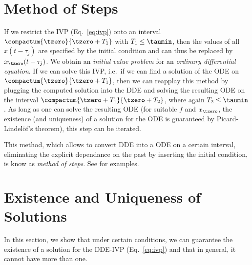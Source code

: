 \section{Method of Steps}
    \label{sec:method-of-steps}
    
    If we restrict the IVP (Eq.~\ref{eq:ivp}) onto an interval $\compactum{\tzero}{\tzero+T_1}$ with $T_1\leq\taumin$, then the values of all $x(t-\tau_j)$ are specified by the initial condition and can thus be replaced by $x_{\tzero}(t-\tau_j)$.
    We obtain an \emph{initial value problem} for an \emph{ordinary differential equation}.
    If we can solve this IVP, i.e.\ if we can find a solution of the ODE on $\compactum{\tzero}{\tzero+T_1}$, then we can reapplay this method by plugging the computed solution into the DDE and solving the resulting ODE on the interval $\compactum{\tzero+T_1}{\tzero+T_2}$, where again $T_2\leq\taumin$. As long as one can solve the resulting ODE (for suitable $f$ and $x_{\tzero}$, the existence (and uniqueness) of a solution for the ODE is guaranteed by Picard-Lindelöf's theorem), this step can be iterated.

    This method, which allows to convert DDE into a ODE on a certain interval, eliminating the explicit dependance on the past by inserting the initial condition, is know as \emph{method of steps}.
    See \cite{Falbo06FDEs} for examples.



\section{Existence and Uniqueness of Solutions}
    \label{solutions-existence-uniqueness}

    In this section, we show that under certain conditions, we can guarantee the existence of a solution for the DDE-IVP (Eq.~\ref{eq:ivp}) and that in general, it cannot have more than one. 


